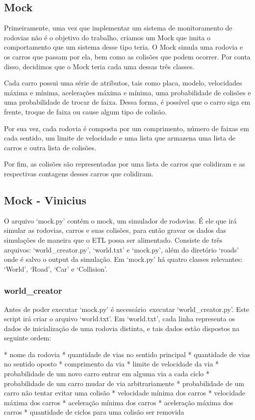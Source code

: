 \documentclass{article}
\begin{document}
    \subsection*{Mock}
    Primeiramente, uma vez que implementar um sistema de monitoramento de rodovias
    não é o objetivo do trabalho, criamos um Mock que imita o comportamento que um sistema desse tipo teria.
    O Mock simula uma rodovia e os carros que passam por ela, bem como as colisões que podem ocorrer.
    Por conta disso, decidimos que o Mock teria cada uma dessas três classes.
    
    Cada carro possui uma série de atributos, tais como placa, modelo, velocidades máxima e mínima, 
    acelerações máxima e mínima, uma probabilidade de colisões e uma probabilidade de trocar de faixa.
    Dessa forma, é possível que o carro siga em frente, troque de faixa ou cause algum tipo de colisão.

    Por sua vez, cada rodovia é composta por um comprimento, número de faixas em cada sentido,
    um limite de velocidade e uma lista que armazena uma lista de carros e outra lista de colisões.

    Por fim, as colisões são representadas por uma lista de carros que colidiram e as respectivas
    contagens desses carros que colidiram.

    \subsection*{Mock - Vinicius}
    O arquivo `mock.py' contém o mock, um simulador de rodovias. É ele que irá simular as rodovias,
    carros e suas colisões, para então gravar os dados das simulações de maneira que o ETL possa ser alimentado.
    Consiste de três arquivos: `world\_creator.py', `world.txt' e `mock.py', além do diretório `roads' onde é salvo
    o output da simulação. Em `mock.py' há quatro classes relevantes: `World', `Road', `Car' e `Collision'.

    \subsubsection*{world\_creator}
    Antes de poder executar `mock.py' é necessário\ executar `world\_creator.py'. Este script irá criar o arquivo
    `world.txt'. Em `world.txt', cada linha representa os dados de inicialização de uma rodovia distinta, e tais
    dados estão dispostos na seguinte ordem:

    * nome da rodovia
    * quantidade de vias no sentido principal
    * quantidade de vias no sentido oposto
    * comprimento da via
    * limite de velocidade da via
    * probabilidade de um novo carro entrar em alguma via a cada ciclo
    * probabilidade de um carro mudar de via arbitrariamente
    * probabilidade de um carro não tentar evitar uma colisão
    * velocidade mínima dos carros
    * velocidade máxima dos carros
    * aceleração mínima dos carros
    * aceleração máxima dos carros
    * quantidade de ciclos para uma colisão ser removida
\end{document}
